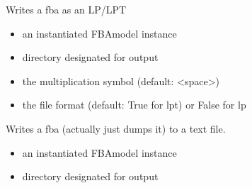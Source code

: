 \documentclass[letterpaper,10pt,english]{sphinxmanual}
\begin{document}

\begin{fulllineitems}
\label{\detokenize{modules_doc:cbmpy.CBWrite.writeModelLPOld}}
\pysigstartsignatures
{}
\pysigstopsignatures
\sphinxAtStartPar
Writes a fba as an LP/LPT
\begin{itemize}
\item {} 
\sphinxAtStartPar
{} an instantiated FBAmodel instance

\item {} 
\sphinxAtStartPar
{} directory designated for output

\item {} 
\sphinxAtStartPar
{} the multiplication symbol (default: \textless{}space\textgreater{})

\item {} 
\sphinxAtStartPar
{} the file format (default: True for lpt) or False for lp

\end{itemize}

\end{fulllineitems}


\begin{fulllineitems}
\label{\detokenize{modules_doc:cbmpy.CBWrite.writeModelRaw}}
\pysigstartsignatures
{}
\pysigstopsignatures
\sphinxAtStartPar
Writes a fba (actually just dumps it) to a text file.
\begin{itemize}
\item {} 
\sphinxAtStartPar
{} an instantiated FBAmodel instance

\item {} 
\sphinxAtStartPar
{} directory designated for output

\end{itemize}

\end{fulllineitems}
\end{document}
